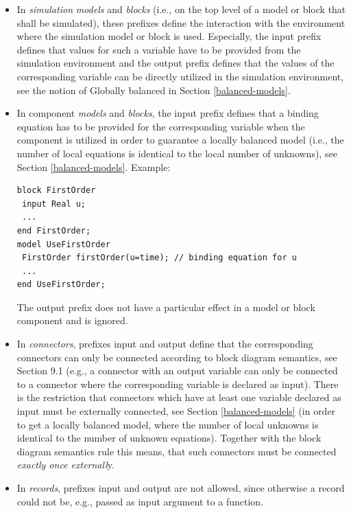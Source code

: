 \documentclass[10pt,a4paper]{report}
\begin{document}
\begin{itemize}
\item
  In \emph{simulation} \emph{models} and \emph{blocks} (i.e., on the top
  level of a model or block that shall be simulated), these prefixes
  define the interaction with the environment where the simulation model
  or block is used. Especially, the input prefix defines that values for
  such a variable have to be provided from the simulation environment
  and the output prefix defines that the values of the corresponding
  variable can be directly utilized in the simulation environment, see
  the notion of Globally balanced in Section \ref{balanced-models}.
\item
  In component \emph{models} and \emph{blocks}, the input prefix defines
  that a binding equation has to be provided for the corresponding
  variable when the component is utilized in order to guarantee a
  locally balanced model (i.e., the number of local equations is
  identical to the local number of unknowns), see Section \ref{balanced-models}. Example:

\begin{lstlisting}[language=modelica]
block FirstOrder
 input Real u;
 ...
end FirstOrder;
model UseFirstOrder
 FirstOrder firstOrder(u=time); // binding equation for u
 ...
end UseFirstOrder;
\end{lstlisting}

The output prefix does not have a particular effect in a model or block
component and is ignored.

\item
  In \emph{connectors}, prefixes input and output define that the
  corresponding connectors can only be connected according to block
  diagram semantics, see Section 9.1 (e.g., a connector with an output
  variable can only be connected to a connector where the corresponding
  variable is declared as input). There is the restriction that
  connectors which have at least one variable declared as input must be
  externally connected, see Section \ref{balanced-models} (in order to get a locally
  balanced model, where the number of local unknowns is identical to the
  number of unknown equations). Together with the block diagram
  semantics rule this means, that such connectors must be connected
  \emph{exactly once externall}y.
\item
  In \emph{records}, prefixes input and output are not allowed, since
  otherwise a record could not be, e.g., passed as input argument to a
  function.
\end{itemize}
\end{document}
